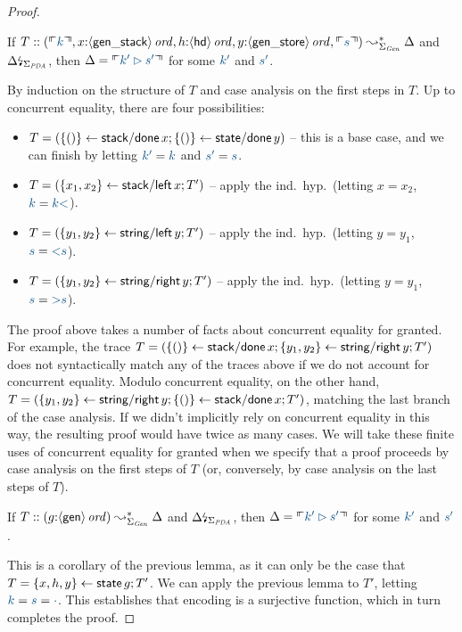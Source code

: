 \begin{proof}
\begin{lemma} If 
$T :: (\ctxinterp{k}, 
       x{:}\istrue{\susp{\sf gen\_stack}}, 
       h{:}\istrue{\susp{\sf hd}},
       y{:}\istrue{\susp{\sf gen\_store}},
       \ctxinterp{s}) 
  \leadsto^*_{\Sigma_{\it Gen}} \Delta$ and
${\Delta}{\mbox{\lightning}}_{\Sigma_{\it
      PDA}}$, then $\Delta = \ctxinterp{k' \rhd s'}$ for some $\obj{k'}$
and $\obj{s'}$.
\end{lemma}
\noindent
By induction on the structure of $T$ and case analysis on the 
first steps in $T$. Up to concurrent equality, there
are four possibilities:
\smallskip
\begin{itemize}
\item $T = (\{{()}\} \leftarrow {{\sf stack/done}\,x}; \{{()}\} \leftarrow {{\sf
      state/done}\,y})$ -- this is a base case, and we can finish by
  letting $\obj{k'} = \obj{k}$ and $\obj{s'} = \obj{s}$.
\item $T = (\{{x_1,x_2}\} \leftarrow {{\sf stack/left}\,x}; T')$ -- apply 
  the ind.~hyp.~(letting $x = x_2$, $\obj{k} =
  \obj{k{\sf <}}$).
\item $T = (\{{y_1,y_2}\} \leftarrow {{\sf string/left}\,y}; T')$ -- apply
  the ind.~hyp.~(letting $y = y_1$, $\obj{s} =
  \obj{{\sf <}s}$).
\item $T = (\{{y_1,y_2}\} \leftarrow {{\sf string/right}\,y}; T')$ -- apply
  the ind.~hyp.~(letting $y = y_1$, $\obj{s} =
  \obj{{\sf >}s}$).
\end{itemize}
\smallskip 
The proof above takes
a number of facts about concurrent equality for granted. 
%
For example, the trace $T = (\{{()}\} \leftarrow {{\sf stack/done}\,x};
\{{y_1,y_2}\} \leftarrow {{\sf string/right}\,y}; T')$ does not syntactically
match any of the traces above if we do not account for concurrent
equality. Modulo concurrent equality, on the other hand, $T =
(\{{y_1,y_2}\} \leftarrow {{\sf string/right}\,y}; \{{()}\} \leftarrow {{\sf
    stack/done}\,x}; T')$, matching the last branch of the case
analysis.  If we didn't implicitly rely on concurrent equality in this
way, the resulting proof would have twice as many cases.  We will take
these finite uses of concurrent equality for granted when we specify
that a proof proceeds by case analysis on the first steps of $T$ (or,
conversely, by case analysis on the last steps of $T$).

\begin{lemma} If 
$T :: (g{:}{\langle {\sf gen} \rangle}\,{{\it ord}}) 
  \leadsto^*_{\Sigma_{\it Gen}} \Delta$ and
${\Delta}{\mbox{\lightning}}_{\Sigma_{\it
      PDA}}$, then $\Delta = \ctxinterp{k' \rhd s'}$ for some $\obj{k'}$
and $\obj{s'}$.
\end{lemma}
\noindent
This is a corollary of the previous lemma, as it can only
be the case that $T = \{{x,h,y}\} \leftarrow {{\sf state}\,g}; T'$. We can apply the previous
lemma to $T'$, letting $\obj{k} = \obj{s} = \obj{\cdot}$.
This establishes that encoding is a surjective function, which in turn
completes the proof. 
\end{proof}

